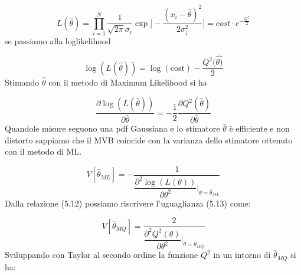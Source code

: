 \documentclass[11pt,a4paper]{book}
\begin{document}
\begin{equation*}
	L(\hat{\theta}) = \prod_{i=1}^N \dfrac{1}{\sqrt{2\pi}\sigma_i}\exp{\Big [-\frac{ (x_i-\hat{\theta})^2}{2 \sigma_i^2} \Big]} = cost \cdot e^{-\frac{Q^2}{2}}
\end{equation*}
se passiamo alla loglikelihood

\begin{equation*}
	\log(L(\hat{\theta})) = \log(\text{cost}) - \dfrac{Q^2(\hat{\theta)}}{2}
\end{equation*}
Stimando $\hat{\theta}$ con il metodo di Maximum Likelihood si ha

\begin{equation}
	\dfrac{\partial \log(L(\hat{\theta}))}{\partial \hat{\theta}} = - \dfrac{1}{2}\dfrac{\partial Q^2(\hat{\theta})}{\partial \hat{\theta}}
\end{equation}
Quandole misure seguono una pdf Gaussiana e lo stimatore $\hat{\theta}$ \`{e} efficiente e non distorto sappiamo che il MVB coincide con la varianza dello stimatore ottenuto con il metodo di ML.

\begin{equation}
	V[\hat{\theta}_{ML}] = - \dfrac{1}{\dfrac{\partial^2 \log(L(\theta))}{\partial \theta^2} \Big \vert_{\theta = \hat{\theta}_{ML}}} 
\end{equation}
Dalla relazione (5.12) possiamo riscrivere l'uguaglianza (5.13) come:

\begin{equation}
	V[\hat{\theta}_{MQ}] = \dfrac{2}{\dfrac{\partial^2Q^2(\theta)}{\partial \theta^2} \Big \vert_{\theta = \hat{\theta}_{MQ}}}
\end{equation}
Sviluppando con Taylor al secondo ordine la funzione $Q^2$ in un intorno di $\hat{\theta}_{MQ}$ si ha:
\end{document}
